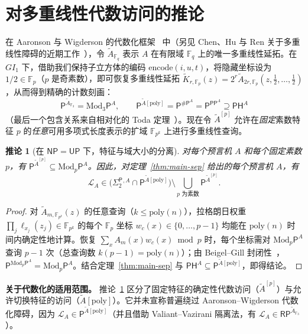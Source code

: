 \documentclass[11pt,a4paper]{article}
\newtheorem{corollary}[theorem]{推论}
\theoremstyle{definition}
\theoremstyle{remark}
\newcommand{\Pcl}{\mathsf{P}}
\newcommand{\NP}{\mathsf{NP}}
\newcommand{\UP}{\mathsf{UP}}
\newcommand{\PP}{\mathsf{PP}}
\newcommand{\PH}{\mathsf{PH}}
\newcommand{\Modp}{\mathrm{Mod}_p\mathsf{P}}
\newcommand{\Modthree}{\mathrm{Mod}_3\mathsf{P}}
\newcommand{\SharpP}{\#\mathsf{P}}
\newcommand{\SigTwo}{\Sigma_2^{\mathsf{P}}}
\newcommand{\F}{\mathbb{F}}
\newcommand{\GI}{GI_1}
\begin{document}
\section{对多重线性代数访问的推论}

在 Aaronson 与 Wigderson 的代数化框架~\cite{AaronsonWigderson2009} 中（另见 Chen、Hu 与 Ren 关于多重线性障碍的近期工作~\cite{ChenHuRen2026}），令 $\widetilde A_{\F_q}$ 表示 $A$ 在有限域 $\F_q$ 上的唯一多重线性延拓。在 $\GI$ 下，借助我们保持子立方体的编码 $\mathrm{encode}(i,u,t)$，将隐藏坐标设为 $1/2\in\F_p$（$p$ 是奇素数），即可恢复多重线性延拓 $\widetilde K_{r,\F_p}(z)=2^r\widetilde A_{2r,\F_p}(z,\tfrac12,\dots,\tfrac12)$，从而得到精确的计数刻画：
\[
  \Pcl^{\widetilde{A}_{\F_3}} = \Modthree^A,
  \qquad
  \Pcl^{\widetilde{A}[\mathrm{poly}]} = \Pcl^{\SharpP^A} = \Pcl^{\PP^A} \supseteq \PH^A
\]
（最后一个包含关系来自相对化的 Toda 定理~\cite{Toda1991}）。现在令 $\widetilde A^{[p]}$ 允许在\emph{固定}素数特征 $p$ 的\emph{任意}可用多项式长度表示的扩域 $\F_{p^k}$ 上进行多重线性查询。

\begin{corollary}[在 $\NP=\UP$ 下，特征与域大小的分离]
\label{cor:char-sep}
对每个预言机 $A$ 和每个固定素数 $p$，有 $\Pcl^{\widetilde A^{[p]}}\subseteq\Modp^A$。因此，对定理~\ref{thm:main-sep} 给出的每个预言机 $A$，有
\[
  \mathcal{L}_A \in \bigl(\SigTwo{}^{,A} \cap \Pcl^{\widetilde{A}[\mathrm{poly}]}\bigr)
  \setminus \bigcup_{p\text{ 为素数}} \Pcl^{\widetilde{A}^{[p]}}.
\]
\end{corollary}

\begin{proof}
对 $\widetilde A_{m,\F_{p^k}}(z)$ 的任意查询（$k\le\mathrm{poly}(n)$），拉格朗日权重 $\prod_j\ell_{x_j}(z_j)\in\F_{p^k}$ 的每个 $\F_p$ 坐标 $w_c(x)\in\{0,\dots,p-1\}$ 均能在 $\mathrm{poly}(n)$ 时间内确定性地计算。恢复 $\sum_x A_m(x)w_c(x)\bmod p$ 时，每个坐标需对 $\Modp^A$ 查询 $p-1$ 次（总查询数 $k(p-1)=\mathrm{poly}(n)$）；由 Beigel--Gill 封闭性~\cite{BeigelGill1992}，$\Pcl^{\Modp^A}=\Modp^A$。结合定理~\ref{thm:main-sep} 与 $\PH^A\subseteq\Pcl^{\widetilde A[\mathrm{poly}]}$，即得结论。
\end{proof}

\textbf{关于代数化的适用范围。} 推论~\ref{cor:char-sep} 区分了固定特征的确定性代数访问（$\widetilde{A}^{[p]}$）与允许切换特征的访问（$\widetilde{A}[\mathrm{poly}]$）。它并未宣称普遍绕过 Aaronson--Wigderson 代数化障碍，因为 $\mathcal{L}_A \in \Pcl^{\widetilde{A}[\mathrm{poly}]}$（并且借助 Valiant--Vazirani 隔离法，有 $\mathcal{L}_A \in \mathsf{RP}^{\widetilde{A}_{\F_3}}$）。
\end{document}
